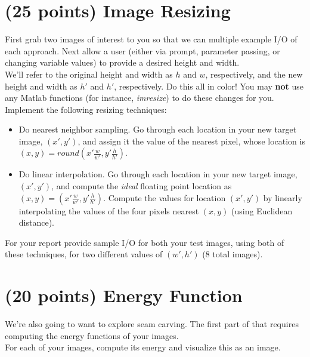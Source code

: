 \documentclass[12pt]{article}
\begin{document}
\newpage
\section{(25 points) Image Resizing}
First grab two images of interest to you so that we can multiple example I/O of each approach.   Next allow a user (either via prompt, parameter passing, or changing variable values) to provide a desired height and width.\\ 

\noindent
We'll refer to the original height and width as $h$ and $w$, respectively, and the new height and width as $h\prime$ and $h\prime$, respectively.  Do this all in color!  You may \textbf{not} use any Matlab functions (for instance, \emph{imresize}) to do these changes for you.\\   

\noindent
Implement the following resizing techniques:
\begin{itemize}
\item Do nearest neighbor sampling.   Go through each location in your new target image, $(x\prime, y\prime)$, and assign it the value of the nearest pixel, whose location is $(x, y) = round(x\prime \frac{w}{w\prime}, y\prime \frac{h}{h\prime})$.
\item Do linear interpolation.   Go through each location in your new target image, $(x\prime, y\prime)$, and compute the \emph{ideal} floating point location as $(x, y) =(x\prime \frac{w}{w\prime}, y\prime \frac{h}{h\prime})$.  Compute the values for location $(x\prime, y\prime)$ by linearly interpolating the values of the four pixels nearest $(x,y)$ (using Euclidean distance).
\end{itemize}

\noindent
For your report provide sample I/O for both your test images, using both of these techniques, for two different values of $(w\prime, h\prime)$ (8 total images).
\newpage

\section{(20 points) Energy Function}
We're also going to want to explore seam carving.  The first part of that requires computing the energy functions of your images.\\

\noindent
For each of your images, compute its energy and visualize this as an image.\\
\end{document}
